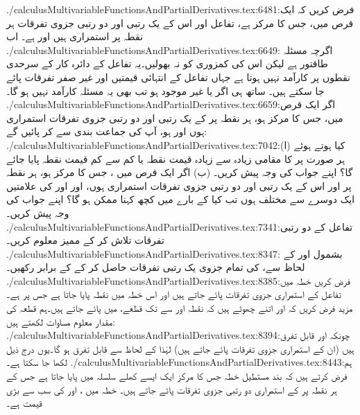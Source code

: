 ./calculusMultivariableFunctionsAndPartialDerivatives.tex:6481:فرض کریں کہ ایک قرص میں، جس  کا مرکز  ہے،  تفاعل  اور اس کے یک رتبی اور دو رتبی   جزوی تفرقات ہر نقطہ پر  استمراری ہیں  اور  ہے۔ اب
./calculusMultivariableFunctionsAndPartialDerivatives.tex:6649:  اگرچہ مسئلہ    طاقتور  ہے لیکن  اس کی کمزوری کو  نہ بھولیں۔یہ تفاعل کے دائرہ کار کے سرحدی نقطوں پر کارآمد نہیں ہوتا ہے جہاں تفاعل کے انتہائی قیمتیں اور غیر صفر تفرقات پائے جا  سکتے   ہیں۔  ساتھ ہی  اگر  یا  غیر موجود ہو تب بھی یہ مسئلہ کارآمد نہیں ہو گا۔
./calculusMultivariableFunctionsAndPartialDerivatives.tex:6659:اگر ایک قرص  میں، جس کا مرکز  ہو، ہر نقطہ پر   کے یک رتبی اور دو رتبی جزوی تفرقات استمراری ہوں اور  ہو، آپ   کی  جماعت بندی  سے کر پائیں گے:
./calculusMultivariableFunctionsAndPartialDerivatives.tex:7042:(ا) کیا  ہوتے ہوئے ہر   صورت  پر  کا مقامی زیادہ سے  زیادہ قیمت  نقطہ یا کم سے کم قیمت  نقطہ پایا جائے گا؟ اپنے جواب کی وجہ پیش کریں۔   (ب)  اگر ایک قرص  میں ، جس کا مرکز   ہو،  ہر نقطہ پر   اور اس کے یک رتبی اور دو رتبی جزوی تفرقات استمراری ہوں، اور  اور  کی علامتیں ایک دوسرے سے مختلف ہوں  تب کیا  کے بارے میں کچھ کہنا ممکن ہو گا؟ اپنے جواب کی وجہ پیش کریں۔
./calculusMultivariableFunctionsAndPartialDerivatives.tex:7341:تفاعل کے دو رتبی تفرقات تلاش کر کے ممیز  معلوم کریں۔
./calculusMultivariableFunctionsAndPartialDerivatives.tex:8347: بشمول  اور  کے لحاظ سے،  کی تمام جزوی یک رتبی تفرقات حاصل کر کے  کے برابر رکھیں۔
./calculusMultivariableFunctionsAndPartialDerivatives.tex:8385:فرض کریں  خطہ  میں  تفاعل   کے  استمراری جزوی تفرقات  پائے جاتے ہیں اور اس خطہ میں نقطہ   پایا جاتا ہے جس پر  ہے۔ مزید فرض کریں کہ  اور  اتنے  چھوٹے ہیں کہ نقطہ اور    سے  تک قطعے،    میں پائے جاتے ہیں۔ہم قطعہ   کی مقدار معلوم مساوات لکھتے ہیں:
./calculusMultivariableFunctionsAndPartialDerivatives.tex:8394:چونکہ  اور   قابل تفرق   ہیں (ان کے استمراری جزوی تفرقات پائے جاتے ہیں)     لہٰذا  کے لحاظ سے  قابل تفرق ہو گا۔یوں درج ذیل لکھا جا سکتا ہے۔
./calculusMultivariableFunctionsAndPartialDerivatives.tex:8443:ہم فرض کرتے ہیں کہ بند مستطیل خطہ  جس کا مرکز   ایک ایسے کھلے سلسلہ میں پایا جاتا ہے جس کے ہر نقطہ پر     کے استمراری دو رتبی جزوی تفرقات پائے جاتے ہیں۔ خطہ  میں ،  اور   کی سب سے بڑی قیمت  ہے۔

